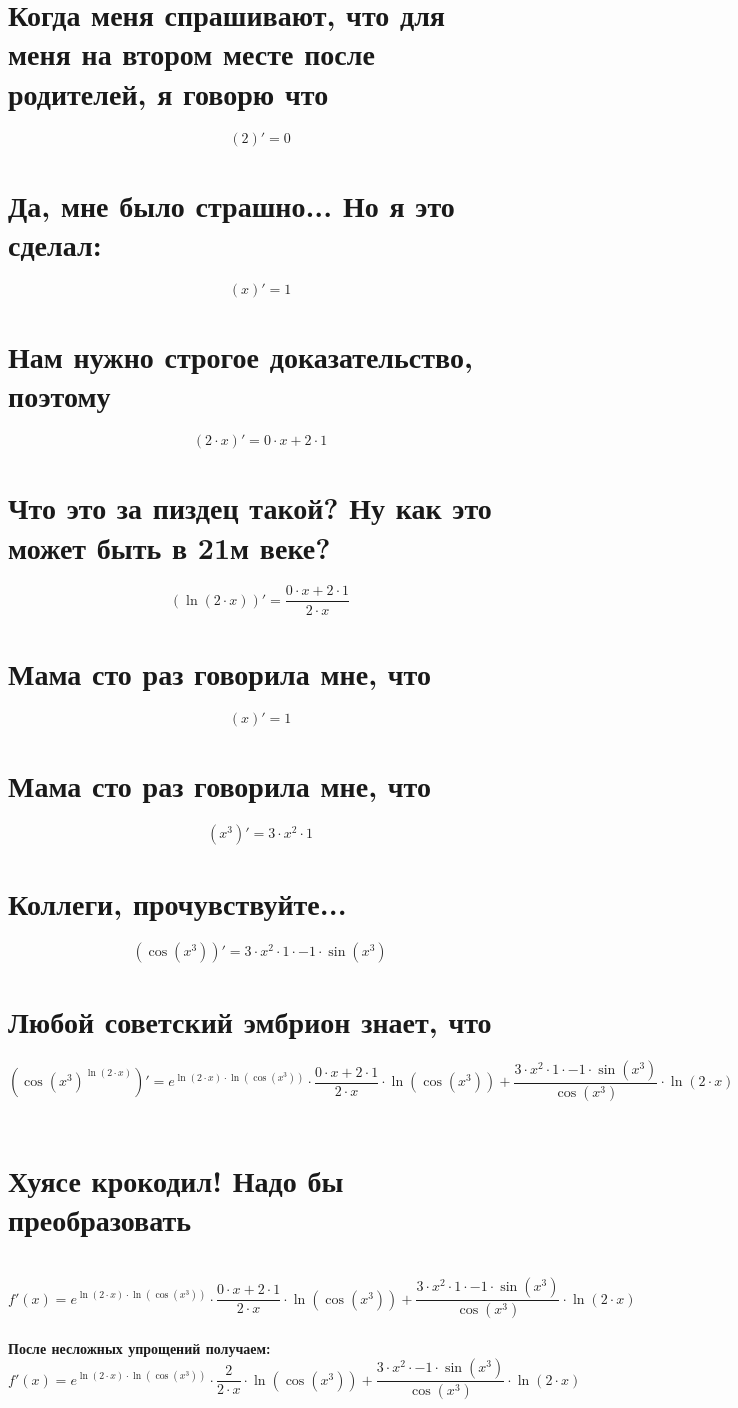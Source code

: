 \documentclass{article}
\begin{document}
\begin{Large}
\begin{onehalfspace}
\section*{Когда меня спрашивают, что для меня на втором месте после родителей, я говорю что}
$$(2)' = 0$$
\section*{Да, мне было страшно... Но я это сделал:}
$$(x)' = 1$$
\section*{Нам нужно строгое доказательство, поэтому}
$$(2 \cdot x)' = 0 \cdot x + 2 \cdot 1$$
\section*{Что это за пиздец такой? Ну как это может быть в 21м веке?}
$$(\ln(2 \cdot x))' = \frac{0 \cdot x + 2 \cdot 1}{2 \cdot x}$$
\section*{Мама сто раз говорила мне, что}
$$(x)' = 1$$
\section*{Мама сто раз говорила мне, что}
$$(x^{3})' = 3 \cdot x^{2} \cdot 1$$
\section*{Коллеги, прочувствуйте...}
$$(\cos(x^{3}))' = 3 \cdot x^{2} \cdot 1 \cdot -1 \cdot \sin(x^{3})$$
\section*{Любой советский эмбрион знает, что}
$$(\cos(x^{3})^{\ln(2 \cdot x)})' = e^{\ln(2 \cdot x) \cdot \ln(\cos(x^{3}))} \cdot \frac{0 \cdot x + 2 \cdot 1}{2 \cdot x} \cdot \ln(\cos(x^{3})) + \frac{3 \cdot x^{2} \cdot 1 \cdot -1 \cdot \sin(x^{3})}{\cos(x^{3})} \cdot \ln(2 \cdot x)$$
\hline \vspace{1cm} \\
\section*{Хуясе крокодил! Надо бы преобразовать}\\
$$ f'(x) = e^{\ln(2 \cdot x) \cdot \ln(\cos(x^{3}))} \cdot \frac{0 \cdot x + 2 \cdot 1}{2 \cdot x} \cdot \ln(\cos(x^{3})) + \frac{3 \cdot x^{2} \cdot 1 \cdot -1 \cdot \sin(x^{3})}{\cos(x^{3})} \cdot \ln(2 \cdot x)$$\\
\textbf{После несложных упрощений получаем: }\\
$$ f'(x) = e^{\ln(2 \cdot x) \cdot \ln(\cos(x^{3}))} \cdot \frac{2}{2 \cdot x} \cdot \ln(\cos(x^{3})) + \frac{3 \cdot x^{2} \cdot -1 \cdot \sin(x^{3})}{\cos(x^{3})} \cdot \ln(2 \cdot x)$$\\
\end{onehalfspace}
\end{Large}
\end{document}
